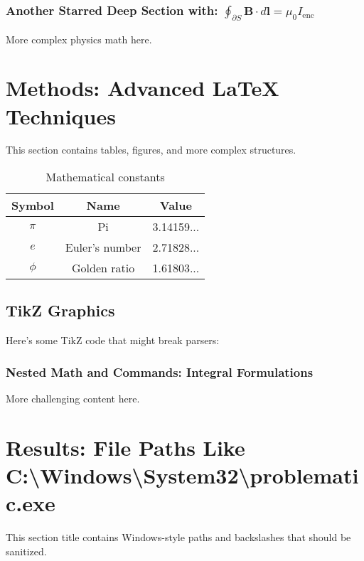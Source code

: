 \documentclass[12pt,a4paper]{article}
\begin{document}
\subsubsection*{Another Starred Deep Section with: \texorpdfstring{$\oint_{\partial S} \mathbf{B} \cdot d\mathbf{l} = \mu_0 I_{\text{enc}}$}{Integral Formulation}}
More complex physics math here.

\section{Methods: Advanced \LaTeX{} Techniques}
This section contains tables, figures, and more complex structures.

\begin{table}[h]
\centering
\begin{tabular}{|c|c|c|}
\hline
\textbf{Symbol} & \textbf{Name} & \textbf{Value} \\
\hline
$\pi$ & Pi & 3.14159... \\
$e$ & Euler's number & 2.71828... \\
$\phi$ & Golden ratio & 1.61803... \\
\hline
\end{tabular}
\caption{Mathematical constants}
\end{table}

\subsection{TikZ Graphics}
Here's some TikZ code that might break parsers:


\subsubsection{Nested Math and Commands: Integral Formulations}
More challenging content here.

\section{Results: File Paths Like C:\textbackslash Windows\textbackslash System32\textbackslash problematic.exe}
This section title contains Windows-style paths and backslashes that should be sanitized.
\end{document}
